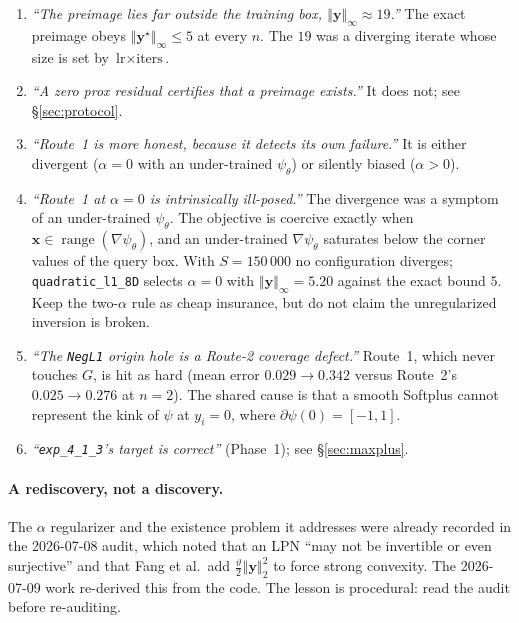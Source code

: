 \documentclass[11pt]{article}
\newcommand{\file}[1]{\texttt{#1}}
\newcommand{\bx}{\boldsymbol{x}}
\newcommand{\by}{\boldsymbol{y}}
\newcommand{\normsq}[1]{\left\Vert #1 \right\Vert_{2}^{2}}
\newcommand{\norminf}[1]{\left\Vert #1 \right\Vert_{\infty}}
\newcommand{\RETR}{\textcolor{purple!80!black}{\textbf{[retracted]}}}
\begin{document}
\begin{enumerate}
  \item[\RETR] \emph{``The preimage lies far outside the training box,
    $\norminf{\by}\approx19$.''} The exact preimage obeys
    $\norminf{\by^{\star}}\leqslant5$ at every $n$. The $19$ was a diverging
    iterate whose size is set by $\text{lr}\times\text{iters}$.
  \item[\RETR] \emph{``A zero prox residual certifies that a preimage exists.''}
    It does not; see \S\ref{sec:protocol}.
  \item[\RETR] \emph{``Route~1 is more honest, because it detects its own
    failure.''} It is either divergent ($\alpha=0$ with an under-trained
    $\psi_{\theta}$) or silently biased ($\alpha>0$).
  \item[\RETR] \emph{``Route~1 at $\alpha=0$ is intrinsically ill-posed.''} The
    divergence was a symptom of an under-trained $\psi_{\theta}$. The objective
    is coercive exactly when $\bx\in\operatorname{range}(\nabla\psi_{\theta})$,
    and an under-trained $\nabla\psi_{\theta}$ saturates below the corner values
    of the query box. With $S=150\,000$ no configuration diverges;
    \file{quadratic\_l1\_8D} selects $\alpha=0$ with $\norminf{\by}=5.20$
    against the exact bound $5$. Keep the two-$\alpha$ rule as cheap insurance,
    but do not claim the unregularized inversion is broken.
  \item[\RETR] \emph{``The \texttt{NegL1} origin hole is a Route-2 coverage
    defect.''} Route~1, which never touches $G$, is hit as hard (mean error
    $0.029\to0.342$ versus Route~2's $0.025\to0.276$ at $n=2$). The shared cause
    is that a smooth Softplus cannot represent the kink of $\psi$ at $y_{i}=0$,
    where $\partial\psi(0)=[-1,1]$.
  \item[\RETR] \emph{``\file{exp\_4\_1\_3}'s target is correct''} (Phase~1);
    see \S\ref{sec:maxplus}.
\end{enumerate}

\paragraph{A rediscovery, not a discovery.} The $\alpha$ regularizer and the
existence problem it addresses were already recorded in the 2026-07-08 audit,
which noted that an LPN ``may not be invertible or even surjective'' and that
Fang et al.\ add $\tfrac{\vartheta}{2}\normsq{\by}$ to force strong convexity.
The 2026-07-09 work re-derived this from the code. The lesson is procedural:
read the audit before re-auditing.
\end{document}
